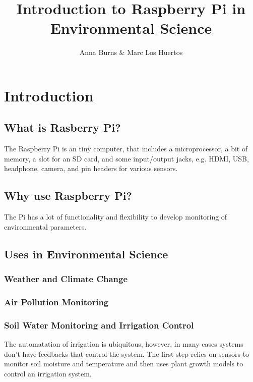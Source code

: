 \documentclass{article}\usepackage[]{graphicx}\usepackage[]{color}
\author{Anna Burns \& Marc Los Huertos}
\title{Introduction to Raspberry Pi in Environmental Science}
\begin{document}
\maketitle

\tableofcontents

\newpage

\section{Introduction}

\subsection{What is Rasberry Pi?}

The Raspberry Pi is an tiny computer, that includes a microprocessor, a bit of memory, a slot for an SD card, and some input/output jacks, e.g. HDMI, USB, headphone, camera, and pin headers for various sensors.

\subsection{Why use Raspberry Pi?}

The Pi has a lot of functionality and flexibility to develop monitoring of environmental parameters. 

\subsection{Uses in Environmental Science}

\subsubsection{Weather and Climate Change}

\subsubsection{Air Pollution Monitoring}

\subsubsection{Soil Water Monitoring and Irrigation Control}

The automatation of irrigation is ubiquitous, however, in many cases systems don't have feedbacks that control the system. The first step relies on sensors to monitor soil moisture and temperature and then uses plant growth models to control an irrigation system. 
\end{document}
